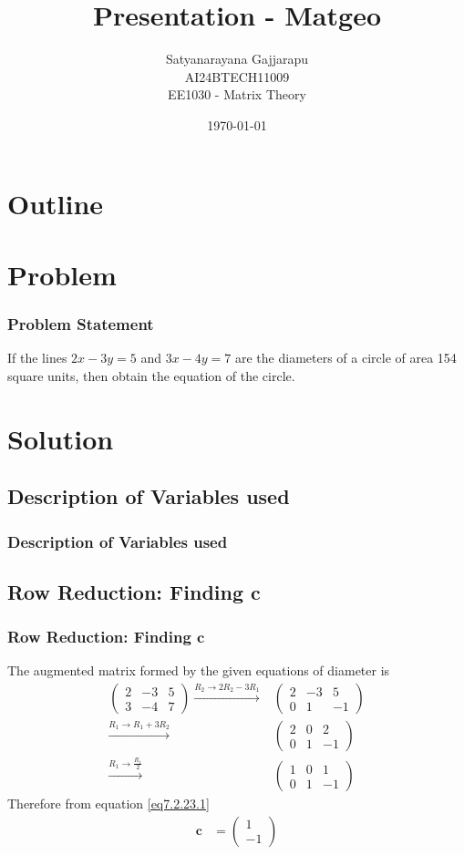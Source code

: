 \documentclass{beamer}
\title{Presentation - Matgeo}
\author{Satyanarayana Gajjarapu \\
AI24BTECH11009 \\
EE1030 - Matrix Theory}
\date{\today}
\theoremstyle{remark}
\newcommand{\myvec}[1]{\ensuremath{\begin{pmatrix}#1\end{pmatrix}}}
\let\vec\mathbf
\numberwithin{equation}{section}
\begin{document}
\begin{frame}
\titlepage
\end{frame}

\section*{Outline}
\begin{frame}
\tableofcontents
\end{frame}
\section{Problem}
\begin{frame}
\frametitle{Problem Statement}
If the lines $2x - 3y = 5$ and $3x - 4y = 7$ are the diameters of a circle of area 154 square units, then obtain the equation of the circle.
\end{frame}

\section{Solution}
\subsection{Description of Variables used}
\begin{frame}
\frametitle{Description of Variables used}
    \begin{table}[h!]
  \centering
  
\end{table}
\end{frame}
\subsection{Row Reduction: Finding $\vec{c}$}
\begin{frame}
\frametitle{Row Reduction: Finding $\vec{c}$}
The augmented matrix formed by the given equations of diameter is
\begin{align}
    \myvec{2 & -3 & 5 \\ 3 & -4 & 7} \xrightarrow[]{R_2 \rightarrow 2R_2 - 3R_1} & \myvec{2 & -3 & 5 \\ 0 & 1 & -1} \\
    \xrightarrow[]{R_1 \rightarrow R_1 + 3R_2} & \myvec{2 & 0 & 2 \\ 0 & 1 & -1} \\
    \xrightarrow[]{R_1 \rightarrow \frac{R_1}{2}} & \myvec{1 & 0 & 1 \\ 0 & 1 & -1} \label{eq7.2.23.1}
\end{align}
Therefore from equation \ref{eq7.2.23.1}
\begin{align}
    \vec{c} & = \myvec{1 \\ -1}
\end{align}
\end{frame}
\end{document}
